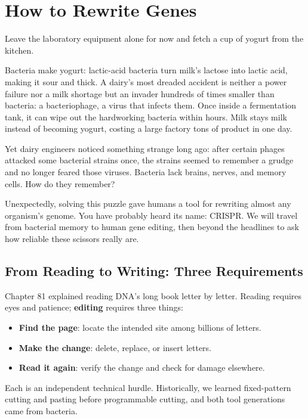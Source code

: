 \chapter{How to Rewrite Genes}

\begin{kaichang}
Leave the laboratory equipment alone for now and fetch a cup of yogurt from the kitchen.

Bacteria make yogurt: lactic-acid bacteria turn milk's lactose into lactic acid, making it sour and thick. A dairy's most dreaded accident is neither a power failure nor a milk shortage but an invader hundreds of times smaller than bacteria: a bacteriophage, a virus that infects them. Once inside a fermentation tank, it can wipe out the hardworking bacteria within hours. Milk stays milk instead of becoming yogurt, costing a large factory tons of product in one day.

Yet dairy engineers noticed something strange long ago: after certain phages attacked some bacterial strains once, the strains seemed to remember a grudge and no longer feared those viruses. Bacteria lack brains, nerves, and memory cells. How do they remember?

Unexpectedly, solving this puzzle gave humans a tool for rewriting almost any organism's genome. You have probably heard its name: CRISPR. We will travel from bacterial memory to human gene editing, then beyond the headlines to ask how reliable these scissors really are.
\end{kaichang}

\section{From Reading to Writing: Three Requirements}

Chapter 81 explained reading DNA's long book letter by letter. Reading requires eyes and patience; \textbf{editing} requires three things:

\begin{itemize}[itemsep=2pt]
\item \textbf{Find the page}: locate the intended site among billions of letters.
\item \textbf{Make the change}: delete, replace, or insert letters.
\item \textbf{Read it again}: verify the change and check for damage elsewhere.
\end{itemize}

Each is an independent technical hurdle. Historically, we learned fixed-pattern cutting and pasting before programmable cutting, and both tool generations came from bacteria.

